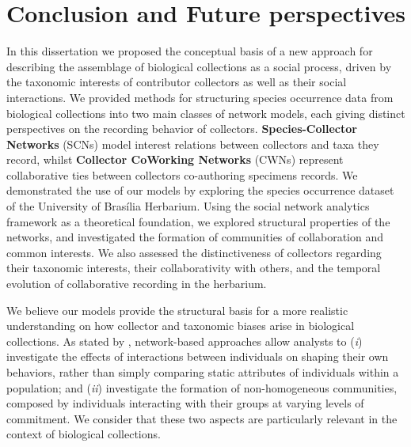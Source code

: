 \chapter{Conclusion and Future perspectives}\label{conclusion_perspectives}
In this dissertation we proposed the conceptual basis of a new approach for describing the assemblage of biological collections as a social process, driven by the taxonomic interests of contributor collectors as well as their social interactions.
We provided methods for structuring species occurrence data from biological collections into two main classes of network models, each giving distinct perspectives on the recording behavior of collectors.
\textbf{Species-Collector Networks} (SCNs) model interest relations between collectors and taxa they record, whilst \textbf{Collector CoWorking Networks} (CWNs) represent collaborative ties between collectors co-authoring specimens records. 
We demonstrated the use of our models by exploring the species occurrence dataset of the University of Brasília Herbarium.
Using the social network analytics framework \cite{Barbier2011,Stork2015} as a theoretical foundation, we explored structural properties of the networks, 
and investigated the formation of communities of collaboration and common interests.
We also assessed the distinctiveness of collectors regarding their taxonomic interests, their collaborativity with others, and the temporal evolution of collaborative recording in the herbarium.


We believe our models provide the structural basis for a more realistic understanding on how collector and taxonomic biases arise in biological collections. 
As stated by , network-based approaches allow analysts to
(\textit{i}) investigate the effects of interactions between individuals on shaping their own behaviors, rather than simply comparing static attributes of individuals within a population; and
(\textit{ii}) investigate the formation of non-homogeneous communities, composed by individuals interacting with their groups at varying levels of commitment.
We consider that these two aspects are particularly relevant in the context of biological collections.

